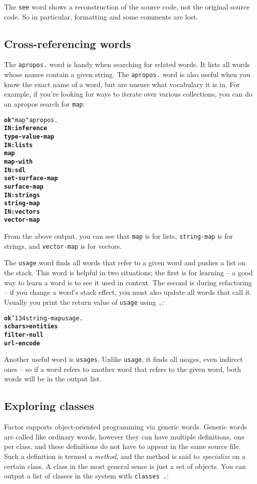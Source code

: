\documentclass{book}
\newcommand{\bs}{\char'134}
\begin{document}
The \texttt{see} word shows a reconstruction of the source code, not the original source code. So in particular, formatting and some comments are lost.

\subsection{Cross-referencing words}

The \texttt{apropos.} word is handy when searching for related words. It lists all words
whose names contain a given string. The \texttt{apropos.} word is also useful when you know the exact name of a word, but are unsure what vocabulary it is in. For example, if you're looking for ways to iterate over various collections, you can do an apropos search for \texttt{map}:

\begin{alltt}
\textbf{ok} "map" apropos.
\textbf{IN: inference
type-value-map
IN: lists
map
map-with
IN: sdl
set-surface-map
surface-map
IN: strings
string-map
IN: vectors
vector-map}
\end{alltt}

From the above output, you can see that \texttt{map} is for lists, \texttt{string-map} is for strings, and \texttt{vector-map} is for vectors.

The \texttt{usage} word finds all words that refer to a given word and pushes a list on the stack. This word is helpful in two situations; the first is for learning -- a good way to learn a word is to see it used in context. The second is during refactoring -- if you change a word's stack effect, you must also update all words that call it. Usually you print the
return value of \texttt{usage} using \texttt{.}:

\begin{alltt}
\textbf{ok} \bs string-map usage .
\textbf{schars>entities
filter-null
url-encode}
\end{alltt}

Another useful word is \texttt{usages}. Unlike \texttt{usage}, it finds all usages, even
indirect ones -- so if a word refers to another word that refers to the given word,
both words will be in the output list.

\subsection{Exploring classes}

Factor supports object-oriented programming via generic words. Generic words are called
like ordinary words, however they can have multiple definitions, one per class, and
these definitions do not have to appear in the same source file. Such a definition is
termed a \emph{method}, and the method is said to \emph{specialize} on a certain
class. A class in the most
general sense is just a set of objects. You can output a list of classes in the system
with \texttt{classes .}:
\end{document}
